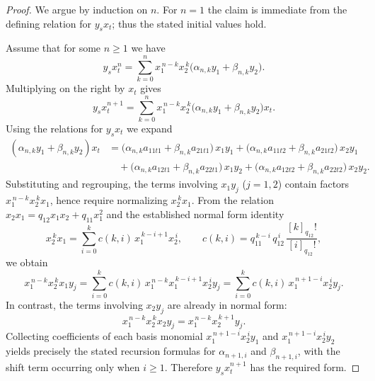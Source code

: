 \documentclass{amsart}
\theoremstyle{definition}
\theoremstyle{remark}
\numberwithin{equation}{section}
\begin{document}
\begin{proof}
We argue by induction on $n$. For $n=1$ the claim is immediate from the defining relation for $y_sx_t$; thus the stated initial values hold.

Assume that for some $n\ge1$ we have
\[
y_sx_t^n=\sum_{k=0}^{n} x_1^{\,n-k}x_2^{\,k}\bigl(\alpha_{n,k}y_1+\beta_{n,k}y_2\bigr).
\]
Multiplying on the right by $x_t$ gives
\[
y_sx_t^{n+1}=\sum_{k=0}^{n} x_1^{\,n-k}x_2^{\,k}\bigl(\alpha_{n,k}y_1+\beta_{n,k}y_2\bigr)x_t.
\]
Using the relations for $y_sx_t$ we expand
\begin{align*}
(\alpha_{n,k}y_1+\beta_{n,k}y_2)x_t
&=\bigl(\alpha_{n,k}a_{11t1}+\beta_{n,k}a_{21t1}\bigr)\,x_1y_1
 +\bigl(\alpha_{n,k}a_{11t2}+\beta_{n,k}a_{21t2}\bigr)\,x_2y_1\\
&\quad+\bigl(\alpha_{n,k}a_{12t1}+\beta_{n,k}a_{22t1}\bigr)\,x_1y_2
 +\bigl(\alpha_{n,k}a_{12t2}+\beta_{n,k}a_{22t2}\bigr)\,x_2y_2.
\end{align*}
Substituting and regrouping, the terms involving $x_1y_j$ ($j=1,2$) contain factors $x_1^{\,n-k}x_2^{\,k}x_1$, hence require normalizing $x_2^{\,k}x_1$. From the relation $x_2x_1=q_{12}x_1x_2+q_{11}x_1^2$ and the established normal form identity
\[
x_2^{\,k}x_1=\sum_{i=0}^{k} c(k,i)\,x_1^{\,k-i+1}x_2^{\,i},
\qquad c(k,i)=q_{11}^{\,k-i}\,q_{12}^{\,i}\,\frac{[k]_{q_{12}}!}{[i]_{q_{12}}!},
\]
we obtain
\[
x_1^{\,n-k}x_2^{\,k}x_1y_j
=
\sum_{i=0}^{k} c(k,i)\,x_1^{\,n-k}x_1^{\,k-i+1}x_2^{\,i}y_j
=
\sum_{i=0}^{k} c(k,i)\,x_1^{\,n+1-i}x_2^{\,i}y_j.
\]
In contrast, the terms involving $x_2y_j$ are already in normal form:
\[
x_1^{\,n-k}x_2^{\,k}x_2y_j=x_1^{\,n-k}x_2^{\,k+1}y_j.
\]
Collecting coefficients of each basis monomial $x_1^{\,n+1-i}x_2^{\,i}y_1$ and $x_1^{\,n+1-i}x_2^{\,i}y_2$ yields precisely the stated recursion formulas for $\alpha_{n+1,i}$ and $\beta_{n+1,i}$, with the shift term occurring only when $i\ge1$. Therefore $y_sx_t^{n+1}$ has the required form.
\end{proof}
\end{document}
